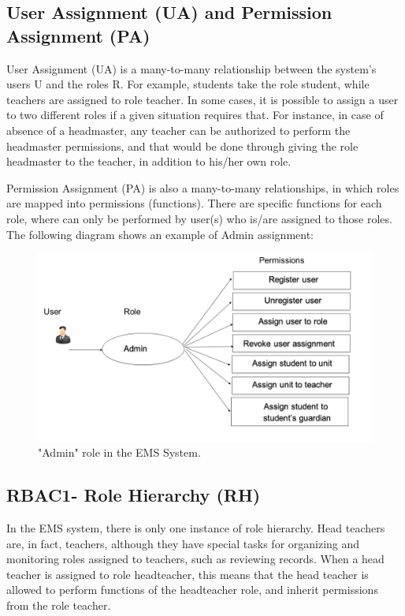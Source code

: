 \subsection{User Assignment (UA) and Permission Assignment (PA)}
User Assignment (UA) is a many-to-many relationship between the system’s users U and the roles R.  For example, students take the role student, while teachers are assigned to role teacher.  In some cases, it is possible to assign a user to two different roles if a given situation requires that.  For instance, in case of absence of a headmaster, any teacher can be authorized to perform the headmaster permissions, and that would be done through giving the role headmaster to the teacher, in addition to his/her own role.

Permission Assignment (PA) is also a many-to-many relationships, in which roles are mapped into permissions (functions).  There are specific functions for each role, where can only be performed by user(s) who is/are assigned to those roles.  The following diagram shows an example of Admin assignment:

\begin{figure}[bht]
\centering
\includegraphics[scale=0.26]{addAdmin.png}
\caption{"Admin" role in the EMS System.}
\label{fig:permstud}
\end{figure}


\subsection{RBAC1- Role Hierarchy (RH)}

In the EMS system, there is only one instance of role hierarchy.  Head teachers are, in fact, teachers, although they have special tasks for organizing and monitoring roles assigned to teachers, such as reviewing records.  When a head teacher is assigned to role headteacher, this means that the head teacher is allowed to perform functions of the headteacher role, and inherit permissions from the role teacher.

